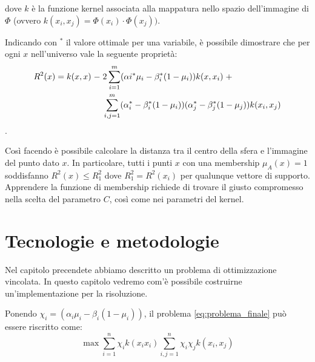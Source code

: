 \documentclass[a4paper,12pt]{report}
\begin{document}
\noindent dove $k$ è la funzione kernel associata alla mappatura nello spazio dell'immagine di $\Phi$ (ovvero $k(x_i,x_j) = \Phi(x_i)\cdot\Phi(x_j))$.

Indicando con $^*$ il valore ottimale per una variabile, è possibile dimostrare che per ogni $x$ nell'universo vale la seguente proprietà:
\begin{equation*}
\begin{split}
    R^{2}(x) = k(x,x) \hspace{0,1cm}- \hspace{0,1cm}&2\displaystyle\sum_{i=1}^{m}(\alpha{i}^{*}\mu_{i} - \beta_{i}^{*}(1-\mu_{i}))k(x,x_i)\hspace{0,1cm} + \\ 
    &\displaystyle\sum_{i,j=1}^{m}(\alpha_{i}^{*} - \beta_{i}^{*}(1-\mu_{i}))(\alpha_{j}^{*} - \beta_{j}^{*}(1-\mu_{j}))k(x_i,x_j)
\end{split}
\end{equation*}.

\noindent Così facendo è possibile calcolare la distanza tra il centro della sfera e l'immagine del punto dato $x$.
In particolare, tutti i punti $x$ con una membership $\mu_{A}(x) = 1$ soddisfanno $R^2(x) \le R^2_1$ dove $R^2_1 = R^2(x_i)$ per qualunque vettore di supporto.
Apprendere la funzione di membership richiede di trovare il giusto compromesso nella scelta del parametro $C$, così come nei parametri del kernel.




%
%

\chapter{Tecnologie e metodologie}
\label{Capitolo 2}
Nel capitolo precendete abbiamo descritto un problema di ottimizzazione vincolata. In questo capitolo vedremo com'è possibile costruirne un'implementazione per la risoluzione.

\bigskip

\noindent Ponendo $\chi_i = (\alpha_i\mu_i - \beta_i(1-\mu_i))$, il problema \ref{eq:problema_finale} può essere riscritto come:
\begin{equation}
    \max \displaystyle\sum_{i=1}^{n}\chi_ik(x_ix_i)\displaystyle\sum_{i,j=1}^{n}\chi_i\chi_j k(x_i,x_j)
\label{eq:problema_finale_2}
\end{equation}
\end{document}
